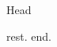 \documentclass{article}
\begin{document}
\hypertarget{h}{Head} rest.\hypertarget{e}{} end.
\end{document}
